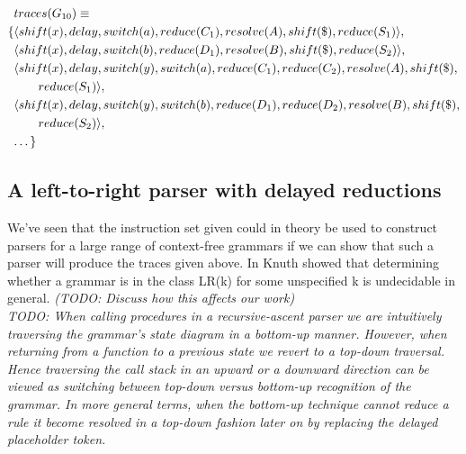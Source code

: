 \documentclass[11pt]{article}
\begin{document}
\parbox{.3\textwidth}{\begin{align*}
&traces(G_{10}) \equiv \\
 \{ & \langle shift(x), delay, switch(a), reduce(C_1), resolve(A), shift(\$), reduce(S_1) \rangle,\\
    & \langle shift(x), delay, switch(b), reduce(D_1), resolve(B), shift(\$), reduce(S_2) \rangle,\\
    & \langle shift(x), delay, switch(y), switch(a), reduce(C_1), reduce(C_2), resolve(A), shift(\$), \\&\qquad reduce(S_1) \rangle,\\
    & \langle shift(x), delay, switch(y), switch(b), reduce(D_1), reduce(D_2), resolve(B), shift(\$), \\&\qquad reduce(S_2) \rangle,\\
    & \textellipsis \}
\end{align*}}


\subsection{A left-to-right parser with delayed reductions}
We've seen that the instruction set given could in theory be used to construct parsers for a large range of context-free grammars if we can show that such a parser will produce the traces given above.
In \cite{knuth65} Knuth showed that determining whether a grammar is in the class LR(k) for some unspecified k is undecidable in general. \emph{ (TODO: Discuss how this affects our work) }\\

\emph{TODO:
When calling procedures in a recursive-ascent parser we are intuitively traversing the grammar's state diagram in a bottom-up manner.
However, when returning from a function to a previous state we revert to a top-down traversal.
Hence traversing the call stack in an upward or a downward direction can be viewed as switching between top-down versus bottom-up recognition of the grammar. 
In more general terms, when the bottom-up technique cannot reduce a rule it become resolved in a top-down fashion later on by replacing the delayed placeholder token.}
\end{document}
